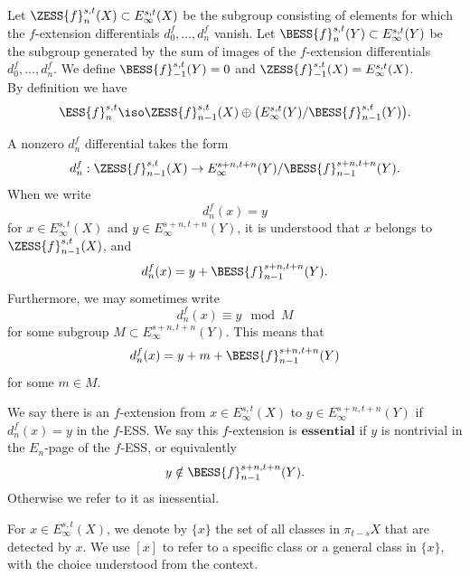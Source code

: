 \begin{notation}\label{nota:ess-notation}
    Let $\ZESS{f}^{s,t}_n(X)\subset E^{s,t}_\infty(X)$ be the subgroup consisting of elements for which the $f$-extension differentials $d^f_0,\dots,d^f_n$ vanish.
    Let $\BESS{f}^{s,t}_n(Y)\subset E^{s,t}_\infty(Y)$ be the subgroup generated by the sum of images of the $f$-extension differentials $d^f_0,\dots,d^f_n$. We define $\BESS{f}^{s,t}_{-1}(Y)=0$ and $\ZESS{f}^{s,t}_{-1}(X)=E^{s,t}_\infty(X)$.\\
    
    By definition we have
    $$\ESS{f}^{s,t}_n\iso \ZESS{f}^{s,t}_{n-1}(X)\oplus \big(E^{s,t}_\infty(Y)/\BESS{f}^{s,t}_{n-1}(Y)\big).$$
    
    A nonzero $d^f_n$ differential takes the form
    $$d^f_n: \ZESS{f}^{s,t}_{n-1}(X)\to E^{s+n,t+n}_\infty(Y)/\BESS{f}^{s+n,t+n}_{n-1}(Y).$$
     When we write 
    $$d^f_n(x)=y$$
    for $x\in E_\infty^{s,t}(X)$ and $y\in E_\infty^{s+n,t+n}(Y)$, it is understood that $x$ belongs to $\ZESS{f}^{s,t}_{n-1}(X)$, and 
    $$d^f_n(x)=y+\BESS{f}^{s+n,t+n}_{n-1}(Y).$$
    Furthermore, we may sometimes write
    $$d^f_n(x)\equiv y\mod M$$
    for some subgroup $M\subset E_\infty^{s+n,t+n}(Y)$. This means that 
    $$d^f_n(x)=y+m+\BESS{f}^{s+n,t+n}_{n-1}(Y)$$
    for some $m\in M$.
\end{notation}

\begin{definition}\label{def:f-extension}
    We say there is an $f$-extension from $x\in E_\infty^{s,t}(X)$ to $y\in E_\infty^{s+n,t+n}(Y)$ if $d_n^{f}(x)=y$ in the $f$-ESS. We say this $f$-extension is $\textbf{essential}$ if $y$ is nontrivial in the $E_n$-page of the $f$-ESS, or equivalently $$y\notin \BESS{f}^{s+n,t+n}_{n-1}(Y).$$
    Otherwise we refer to it as inessential.
\end{definition}

\begin{notation}
    For $x\in E_\infty^{s,t}(X)$, we denote by $\{x\}$  the set of all classes in $\pi_{t-s}X$ that are detected by $x$. We use $[x]$ to refer to a specific class or a general class in $\{x\}$, with the choice understood from the context.
\end{notation}


